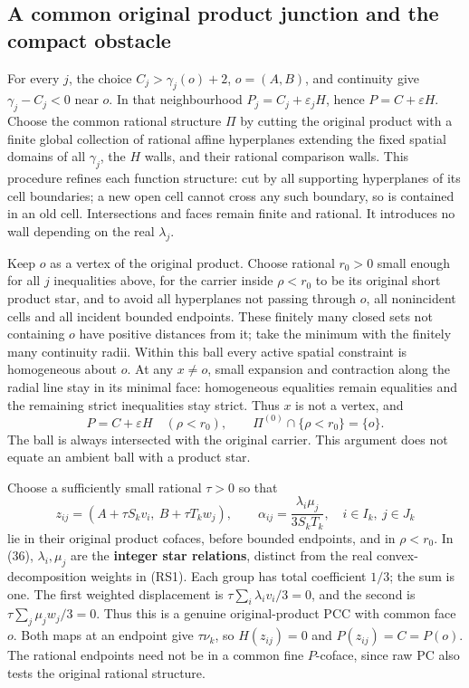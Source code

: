 \documentclass[
  11pt,
]{article}
\begin{document}
\subsection{A common original product junction and the compact
obstacle}\label{a-common-original-product-junction-and-the-compact-obstacle}

For every \(j\), the choice \(C_j>\gamma_j(o)+2\), \(o=(A,B)\), and
continuity give \(\gamma_j-C_j<0\) near \(o\). In that neighbourhood
\(P_j=C_j+\varepsilon_jH\), hence \(P=C+\varepsilon H\). Choose the
common rational structure \(\Pi\) by cutting the original product with a
finite global collection of rational affine hyperplanes extending the
fixed spatial domains of all \(\gamma_j\), the \(H\) walls, and their
rational comparison walls. This procedure refines each function
structure: cut by all supporting hyperplanes of its cell boundaries; a
new open cell cannot cross any such boundary, so is contained in an old
cell. Intersections and faces remain finite and rational. It introduces
no wall depending on the real \(\lambda_j\).

Keep \(o\) as a vertex of the original product. Choose rational
\(r_0>0\) small enough for all \(j\) inequalities above, for the carrier
inside \(\rho<r_0\) to be its original short product star, and to avoid
all hyperplanes not passing through \(o\), all nonincident cells and all
incident bounded endpoints. These finitely many closed sets not
containing \(o\) have positive distances from it; take the minimum with
the finitely many continuity radii. Within this ball every active
spatial constraint is homogeneous about \(o\). At any \(x\ne o\), small
expansion and contraction along the radial line stay in its minimal
face: homogeneous equalities remain equalities and the remaining strict
inequalities stay strict. Thus \(x\) is not a vertex, and \[
 P=C+\varepsilon H\quad(\rho<r_0),\qquad
                  \Pi^{(0)}\cap\{\rho<r_0\}=\{o\}.           \tag{35}
\] The ball is always intersected with the original carrier. This
argument does not equate an ambient ball with a product star.

Choose a sufficiently small rational \(\tau>0\) so that \[
 z_{ij}=(A+\tau S_kv_i,\ B+\tau T_kw_j),\qquad
 \alpha_{ij}=\frac{\lambda_i\mu_j}{3S_kT_k},
 \quad i\in I_k,\ j\in J_k                                  \tag{36}
\] lie in their original product cofaces, before bounded endpoints, and
in \(\rho<r_0\). In (36), \(\lambda_i,\mu_j\) are the \textbf{integer
star relations}, distinct from the real convex-decomposition weights in
(RS1). Each group has total coefficient \(1/3\); the sum is one. The
first weighted displacement is \(\tau\sum_i\lambda_iv_i/3=0\), and the
second is \(\tau\sum_j\mu_jw_j/3=0\). Thus this is a genuine
original-product PCC with common face \(o\). Both maps at an endpoint
give \(\tau\nu_k\), so \(H(z_{ij})=0\) and \(P(z_{ij})=C=P(o)\). The
rational endpoints need not be in a common fine \(P\)-coface, since raw
PC also tests the original rational structure.
\end{document}
